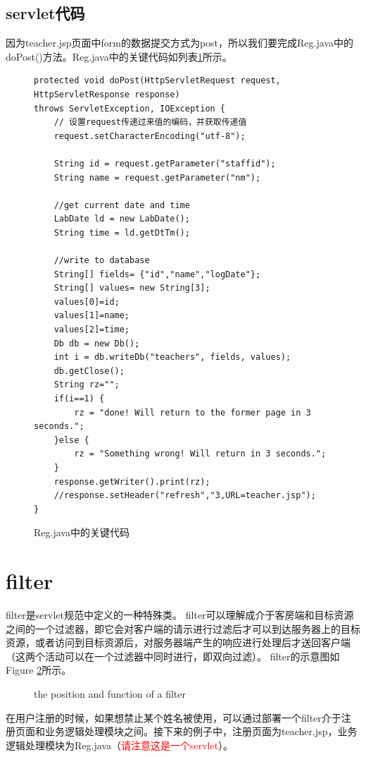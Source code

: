 \subsection{servlet代码}
因为teacher.jsp页面中form的数据提交方式为post，所以我们要完成Reg.java中的doPost()方法。Reg.java中的关键代码如列表\ref{reg}所示。
\begin{figure}
\begin{lstlisting}
protected void doPost(HttpServletRequest request, HttpServletResponse response) 
throws ServletException, IOException {
	// 设置request传递过来值的编码，并获取传递值
	request.setCharacterEncoding("utf-8");
	
	String id = request.getParameter("staffid");
	String name = request.getParameter("nm");
	
	//get current date and time
	LabDate ld = new LabDate();
	String time = ld.getDtTm();
	
	//write to database
	String[] fields= {"id","name","logDate"};
	String[] values= new String[3];
	values[0]=id;
	values[1]=name;
	values[2]=time;
	Db db = new Db();
	int i = db.writeDb("teachers", fields, values);
	db.getClose();
	String rz="";
	if(i==1) {
		rz = "done! Will return to the former page in 3 seconds.";
	}else {
		rz = "Something wrong! Will return in 3 seconds.";
	}
	response.getWriter().print(rz);
	//response.setHeader("refresh","3,URL=teacher.jsp");
}
\end{lstlisting}
\caption{Reg.java中的关键代码}
\label{reg}
\end{figure}

\section{filter}
filter是servlet规范中定义的一种特殊类。
filter可以理解成介于客房端和目标资源之间的一个过滤器，即它会对客户端的请示进行过滤后才可以到达服务器上的目标资源，或者访问到目标资源后，对服务器端产生的响应进行处理后才送回客户端（这两个活动可以在一个过滤器中同时进行，即双向过滤）。
filter的示意图如Figure \ref{filter}所示。
\begin{figure}
\caption{the position and function of a filter}
\label{filter}
\end{figure}
在用户注册的时候，如果想禁止某个姓名被使用，可以通过部署一个filter介于注册页面和业务逻辑处理模块之间。接下来的例子中，注册页面为teacher.jsp，业务逻辑处理模块为Reg.java（\textcolor{red}{请注意这是一个servlet}）。

